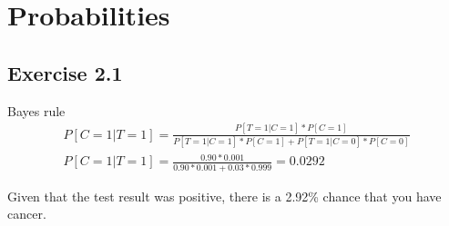 \section{Probabilities}

\subsection{Exercise 2.1}
Bayes rule
\begin{gather}
  P[C=1|T=1] = \frac{P[T=1|C=1]*P[C=1]}{P[T=1|C=1]*P[C=1] + P[T=1|C=0]*P[C=0]} \\
  P[C=1|T=1]= \frac{0.90*0.001}{0.90*0.001 + 0.03*0.999} = 0.0292
\end{gather}

Given that the test result was positive, there is a 2.92\% chance that you have cancer.